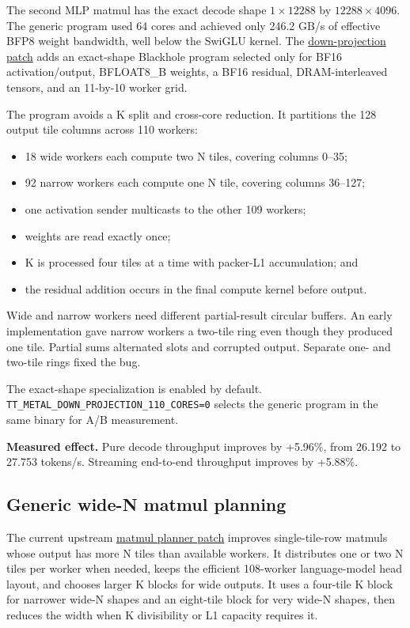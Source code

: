 \documentclass[
  10pt,
  american,
  10pt,
  letterpaper]{article}
\providecommand{\tightlist}{%
  \setlength{\itemsep}{0pt}\setlength{\parskip}{0pt}}
\begin{document}
The second MLP matmul has the exact decode shape \(1\times12288\) by
\(12288\times4096\). The generic program used 64 cores and achieved only
246.2 GB/s of effective BFP8 weight bandwidth, well below the SwiGLU
kernel. The
\href{../../third_party/tt_metal/down_projection_110_core.patch}{down-projection
patch} adds an exact-shape Blackhole program selected only for BF16
activation/output, BFLOAT8\_B weights, a BF16 residual, DRAM-interleaved
tensors, and an 11-by-10 worker grid.

The program avoids a K split and cross-core reduction. It partitions the
128 output tile columns across 110 workers:

\begin{itemize}
\tightlist
\item
  18 wide workers each compute two N tiles, covering columns 0--35;
\item
  92 narrow workers each compute one N tile, covering columns 36--127;
\item
  one activation sender multicasts to the other 109 workers;
\item
  weights are read exactly once;
\item
  K is processed four tiles at a time with packer-L1 accumulation; and
\item
  the residual addition occurs in the final compute kernel before
  output.
\end{itemize}

Wide and narrow workers need different partial-result circular buffers.
An early implementation gave narrow workers a two-tile ring even though
they produced one tile. Partial sums alternated slots and corrupted
output. Separate one- and two-tile rings fixed the bug.

The exact-shape specialization is enabled by default.
\texttt{TT\_METAL\_DOWN\_PROJECTION\_110\_CORES=0} selects the generic
program in the same binary for A/B measurement.

\textbf{Measured effect.} Pure decode throughput improves by +5.96\%,
from 26.192 to 27.753 tokens/s. Streaming end-to-end throughput improves
by +5.88\%.

\hypertarget{generic-wide-n-matmul-planning}{%
\subsection{Generic wide-N matmul
planning}\label{generic-wide-n-matmul-planning}}

The current upstream
\href{../../third_party/tt_metal/matmul_balanced_1d_planner.patch}{matmul
planner patch} improves single-tile-row matmuls whose output has more N
tiles than available workers. It distributes one or two N tiles per
worker when needed, keeps the efficient 108-worker language-model head
layout, and chooses larger K blocks for wide outputs. It uses a
four-tile K block for narrower wide-N shapes and an eight-tile block for
very wide-N shapes, then reduces the width when K divisibility or L1
capacity requires it.
\end{document}
